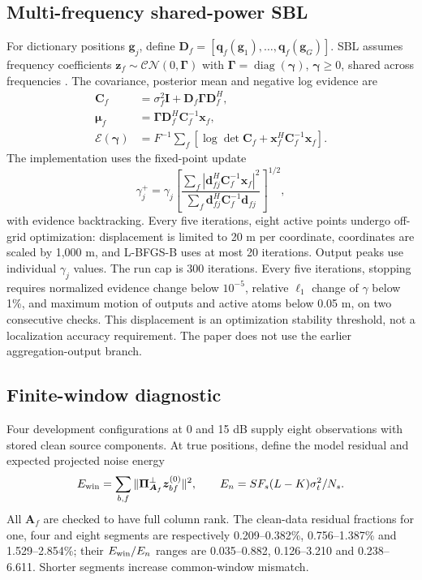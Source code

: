 \documentclass[a4paper,12pt,review]{cas-sc}
\begin{document}
\subsection{Multi-frequency shared-power SBL}
For dictionary positions $\bm g_j$, define $\bm D_f=[\bm q_f(\bm g_1),\ldots,\bm q_f(\bm g_G)]$. SBL assumes frequency coefficients $\bm z_f\sim\mathcal{CN}(0,\bm\Gamma)$ with $\bm\Gamma=\operatorname{diag}(\bm\gamma)$, $\bm\gamma\ge0$, shared across frequencies \cite{Nannuru2019}. The covariance, posterior mean and negative log evidence are
\begin{align}
\bm C_f&=\sigma_f^2\bm I+\bm D_f\bm\Gamma\bm D_f^H,\\
\bm\mu_f&=\bm\Gamma\bm D_f^H\bm C_f^{-1}\bm x_f,\\
\mathcal E(\bm\gamma)&=F^{-1}\sum_f
 [\log\det\bm C_f+\bm x_f^H\bm C_f^{-1}\bm x_f].
\end{align}
The implementation uses the fixed-point update
\begin{equation}
\gamma_j^+=\gamma_j\left[
\frac{\sum_f|\bm d_{fj}^H\bm C_f^{-1}\bm x_f|^2}
{\sum_f\bm d_{fj}^H\bm C_f^{-1}\bm d_{fj}}
\right]^{1/2},
\end{equation}
with evidence backtracking. Every five iterations, eight active points undergo off-grid optimization: displacement is limited to 20 m per coordinate, coordinates are scaled by 1,000 m, and L-BFGS-B uses at most 20 iterations. Output peaks use individual $\gamma_j$ values. The run cap is 300 iterations. Every five iterations, stopping requires normalized evidence change below $10^{-5}$, relative $\ell_1$ change of $\gamma$ below 1\%, and maximum motion of outputs and active atoms below 0.05 m, on two consecutive checks. This displacement is an optimization stability threshold, not a localization accuracy requirement. The paper does not use the earlier aggregation-output branch.

\subsection{Finite-window diagnostic}
Four development configurations at 0 and 15 dB supply eight observations with stored clean source components. At true positions, define the model residual and expected projected noise energy
\begin{equation}
E_{\rm win}=\sum_{b,f}\|\bm\Pi_{\bm A_f}^{\perp}\bm z_{bf}^{(0)}\|^2,
\qquad E_n=SF_s(L-K)\sigma_t^2/N_s.
\end{equation}
All $\bm A_f$ are checked to have full column rank. The clean-data residual fractions for one, four and eight segments are respectively 0.209--0.382\%, 0.756--1.387\% and 1.529--2.854\%; their $E_{\rm win}/E_n$ ranges are 0.035--0.882, 0.126--3.210 and 0.238--6.611. Shorter segments increase common-window mismatch.
\end{document}
